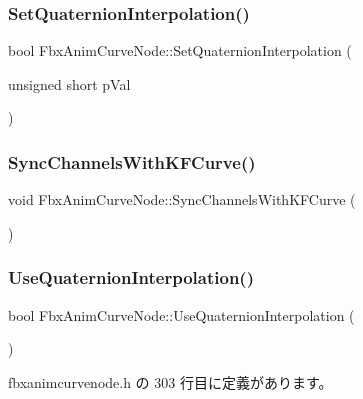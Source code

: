 \subsubsection{\texorpdfstring{Set\+Quaternion\+Interpolation()}{SetQuaternionInterpolation()}}
{\footnotesize\ttfamily bool Fbx\+Anim\+Curve\+Node\+::\+Set\+Quaternion\+Interpolation (\begin{DoxyParamCaption}\item[{unsigned short}]{p\+Val }\end{DoxyParamCaption})}

\mbox{\label{class_fbx_anim_curve_node_aa52265be388b803f8880e1911e211236}} 
\subsubsection{\texorpdfstring{Sync\+Channels\+With\+K\+F\+Curve()}{SyncChannelsWithKFCurve()}}
{\footnotesize\ttfamily void Fbx\+Anim\+Curve\+Node\+::\+Sync\+Channels\+With\+K\+F\+Curve (\begin{DoxyParamCaption}{ }\end{DoxyParamCaption})}

\mbox{\label{class_fbx_anim_curve_node_a431f4ad514b9c72efc78c1f16dc50b6b}} 
\subsubsection{\texorpdfstring{Use\+Quaternion\+Interpolation()}{UseQuaternionInterpolation()}}
{\footnotesize\ttfamily bool Fbx\+Anim\+Curve\+Node\+::\+Use\+Quaternion\+Interpolation (\begin{DoxyParamCaption}{ }\end{DoxyParamCaption})\hspace{0.3cm}{\ttfamily [inline]}}



 fbxanimcurvenode.\+h の 303 行目に定義があります。



